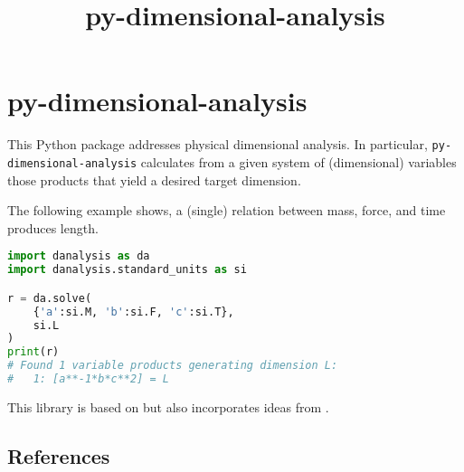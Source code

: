\documentclass[11pt]{article}
\title{py-dimensional-analysis}
\date{}
\begin{document}
\maketitle

\section{py-dimensional-analysis}
This Python package addresses physical dimensional analysis. In particular, \texttt{py-dimensional-analysis} calculates from a given system of (dimensional) variables those products that yield a desired target dimension.


The following example shows, a (single) relation between mass, force, and time produces length.

\begin{lstlisting}[language=Python]
import danalysis as da
import danalysis.standard_units as si

r = da.solve(
    {'a':si.M, 'b':si.F, 'c':si.T}, 
    si.L
)
print(r)
# Found 1 variable products generating dimension L:
#   1: [a**-1*b*c**2] = L
\end{lstlisting}

This library is based on \cite{szirtes2007applied} but also incorporates ideas from \cite{santiago2019first, sonin2001dimensional}.

\subsection{References}

\begingroup
\renewcommand{\section}[2]{}%

\endgroup
\end{document}
